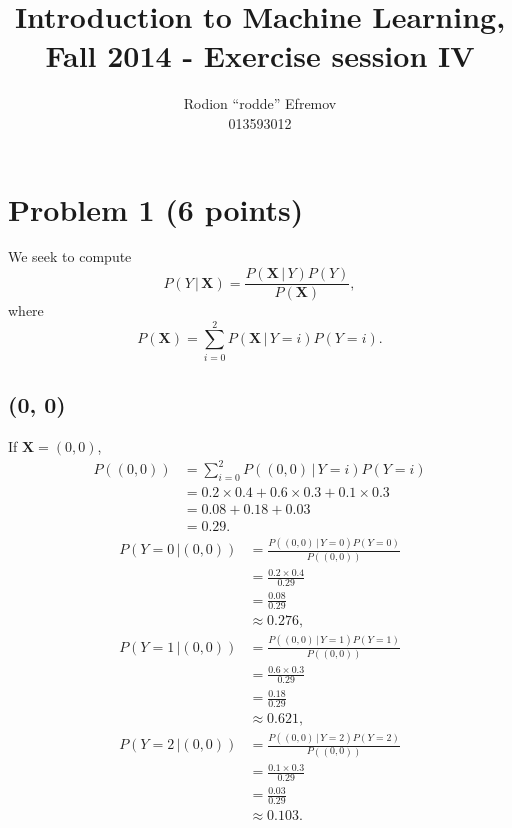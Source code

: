 \documentclass[10pt]{article}
\title{Introduction to Machine Learning, Fall 2014 - Exercise session IV}
\author{Rodion ``rodde'' Efremov \\ 013593012}
\begin{document}
 \maketitle

\section*{Problem 1 (6 points)}
We seek to compute 
\[
P(Y \,| \, \textbf{X}) = \frac{P(\textbf{X} \, | \, Y) P(Y)}{P(\textbf{X})},
\]
where
\[
P(\textbf{X}) = \sum_{i = 0}^2 P(\textbf{X} \, | \, Y = i)P(Y = i).
\]
\subsection*{(0, 0)}
If $\textbf{X} = (0,0)$, 
\begin{align*}
P((0, 0)) &= \sum_{i = 0}^2 P((0, 0) \, | \, Y = i)P(Y = i) \\
             &= 0.2 \times 0.4 + 0.6 \times 0.3 + 0.1 \times 0.3 \\
             &= 0.08 + 0.18 + 0.03 \\
             &= 0.29.
\end{align*}
\begin{align*}
P(Y = 0 \, | (0,0)) &= \frac{P((0, 0) \, | \, Y = 0)P(Y = 0)}{P((0,0))} \\
                           &= \frac{0.2 \times 0.4}{ 0.29 } \\
                           &= \frac{0.08}{0.29} \\
                           &\approx 0.276,
\end{align*}
\begin{align*}
P(Y = 1 \, | (0,0)) &= \frac{P((0, 0) \, | \, Y = 1)P(Y = 1)}{P((0, 0))} \\
                           &= \frac{0.6 \times 0.3}{ 0.29 } \\
                           &= \frac{0.18}{0.29} \\
                           &\approx 0.621,
\end{align*}
\begin{align*}
P(Y = 2 \, | (0,0)) &= \frac{P((0, 0) \, | \, Y = 2)P(Y = 2)}{P((0, 0))} \\
                           &= \frac{0.1 \times 0.3}{ 0.29 } \\
                           &= \frac{0.03}{0.29} \\
                           &\approx 0.103.
\end{align*}
\end{document}
